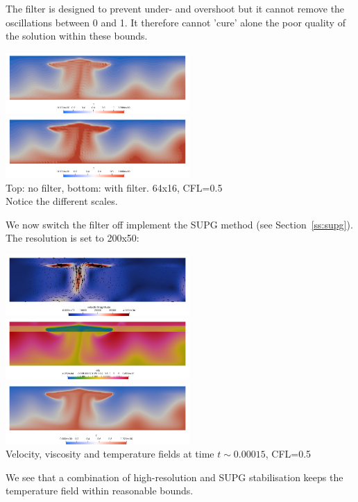 The filter is designed to prevent under- and overshoot but it cannot remove the oscillations between 0 and 1.
It therefore cannot 'cure' alone the poor quality of the solution within these bounds.
\begin{center}
\includegraphics[width=7cm]{python_codes/fieldstone_88/results/without}
\includegraphics[width=7cm]{python_codes/fieldstone_88/results/with}\\
{\captionfont Top: no filter, bottom: with filter. 64x16, CFL=0.5\\ Notice the different scales.}
\end{center}

We now switch the filter off implement the SUPG method (see Section~\ref{ss:supg}). 
The resolution is set to 200x50:
\begin{center}
\includegraphics[width=7cm]{python_codes/fieldstone_88/results/200x50/vel}
\includegraphics[width=7cm]{python_codes/fieldstone_88/results/200x50/eta}\\
\includegraphics[width=7cm]{python_codes/fieldstone_88/results/200x50/T}\\
{\captionfont Velocity, viscosity and temperature fields at time $t\sim 0.00015$, CFL=0.5} 
\end{center}
We see that a combination of high-resolution and SUPG stabilisation keeps the 
temperature field within reasonable bounds. 


